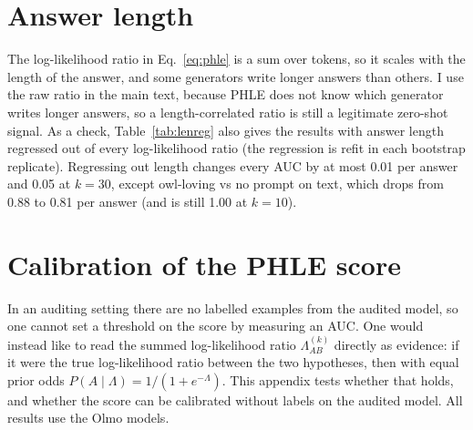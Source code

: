 \documentclass{article}
\newcommand{\phle}{PHLE\xspace}
\begin{document}
\begin{table}[h]
  \centering
  \caption{Owl vs eagle for the ``do not mention'' generators (Olmo), scored with the no-mention headers or system prompts and with the original ones.}
  \label{tab:nomention}
  
\end{table}
\begin{table}[h]
  \centering
  \caption{Other comparisons for the ``do not mention'' generators, Olmo base \phle with no-mention headers.}
  \label{tab:nomention_controls}
  
\end{table}

\section{Answer length}
\label{app:length}

The log-likelihood ratio in Eq.~\eqref{eq:phle} is a sum over tokens, so it scales with the length of the answer, and some generators write longer answers than others.
I use the raw ratio in the main text, because \phle does not know which generator writes longer answers, so a length-correlated ratio is still a legitimate zero-shot signal.
As a check, Table~\ref{tab:lenreg} also gives the results with answer length regressed out of every log-likelihood ratio (the regression is refit in each bootstrap replicate).
Regressing out length changes every AUC by at most 0.01 per answer and 0.05 at $k=30$, except owl-loving vs no prompt on text, which drops from 0.88 to 0.81 per answer (and is still 1.00 at $k=10$).

\begin{table}[h]
  \centering
  \caption{Olmo base \phle with the raw log-likelihood ratio (as in the main text) and with answer length regressed out.}
  \label{tab:lenreg}
  
\end{table}

\section{Calibration of the \phle score}
\label{app:calibration}

In an auditing setting there are no labelled examples from the audited model, so one cannot set a threshold on the score by measuring an AUC.
One would instead like to read the summed log-likelihood ratio $\Lambda^{(k)}_{AB}$ directly as evidence: if it were the true log-likelihood ratio between the two hypotheses, then with equal prior odds $P(A \mid \Lambda) = 1/(1+e^{-\Lambda})$.
This appendix tests whether that holds, and whether the score can be calibrated without labels on the audited model.
All results use the Olmo models.
\end{document}
